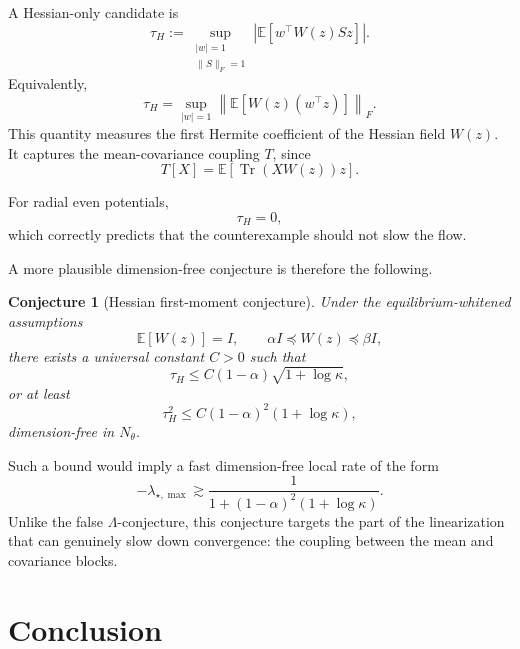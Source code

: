 \documentclass[11pt]{article}
\numberwithin{equation}{section}
\newtheorem{conjecture}[theorem]{Conjecture}
\DeclareMathOperator{\Tr}{Tr}
\begin{document}
A Hessian-only candidate is
\begin{equation}
    \tau_H
    :=
    \sup_{\substack{|w|=1\\ \|S\|_F=1}}
    \left|
    \mathbb E[
    w^\top W(z)Sz
    ]
    \right|.
\end{equation}
Equivalently,
\begin{equation}
    \tau_H
    =
    \sup_{|w|=1}
    \left\|
    \mathbb E[
    W(z)(w^\top z)
    ]
    \right\|_F.
\end{equation}
This quantity measures the first Hermite coefficient of the Hessian field $W(z)$. 
It captures the mean-covariance coupling $T$, since
\begin{equation}
    T[X]
    =
    \mathbb E[
    \Tr(XW(z))z
    ].
\end{equation}

For radial even potentials,
\begin{equation}
    \tau_H=0,
\end{equation}
which correctly predicts that the counterexample should not slow the flow.

A more plausible dimension-free conjecture is therefore the following.

\begin{conjecture}[Hessian first-moment conjecture]
Under the equilibrium-whitened assumptions
\begin{equation}
    \mathbb E[W(z)]=I,
    \qquad
    \alpha I\preceq W(z)\preceq \beta I,
\end{equation}
there exists a universal constant $C>0$ such that
\begin{equation}
    \tau_H
    \le
    C(1-\alpha)\sqrt{1+\log\kappa},
\end{equation}
or at least
\begin{equation}
    \tau_H^2
    \le
    C(1-\alpha)^2(1+\log\kappa),
\end{equation}
dimension-free in $N_\theta$.
\end{conjecture}

Such a bound would imply a fast dimension-free local rate of the form
\begin{equation}
    -\lambda_{\star,\max}
    \gtrsim
    \frac{1}{1+(1-\alpha)^2(1+\log\kappa)}.
\end{equation}
Unlike the false $\Lambda$-conjecture, this conjecture targets the part of the linearization that can genuinely slow down convergence: the coupling between the mean and covariance blocks.

\section{Conclusion}
\end{document}
